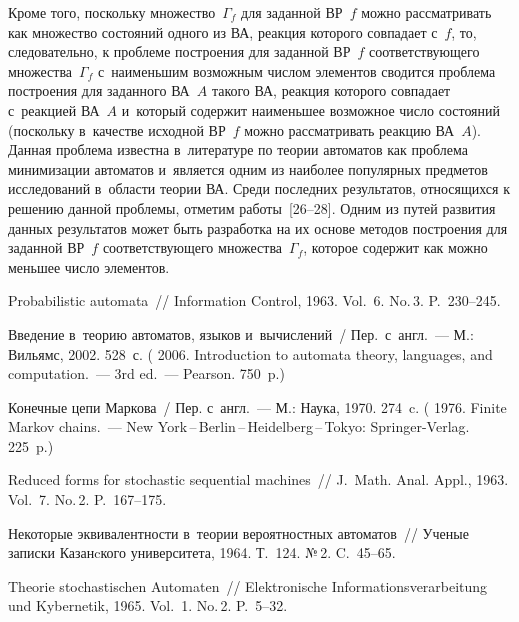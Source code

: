 \begin{multicols}{2}
Кроме того, поскольку множество~$\Gamma_f$ для заданной ВР~$f$
можно рассматривать как множество состояний одного из ВА, реакция которого совпадает с~$f$, то, следовательно,
к проблеме построения  для заданной ВР~$f$ соответствующего
множества~$\Gamma_f$ с~наименьшим
возможным чис\-лом
элементов сводится проблема построения
для заданного ВА~$A$
такого ВА, реакция которого
совпадает с~реакцией ВА~$A$ и~который содержит
наименьшее возможное чис\-ло состояний (поскольку в~качестве
исходной ВР~$f$ можно рассматривать реакцию ВА~$A$).
Данная проблема известна в~литературе по теории автоматов
как проблема минимизации автоматов и~является одним из
наиболее популярных предметов исследований в~области
теории ВА. Среди последних
результатов, относящихся
к решению данной проблемы, отметим работы~[26--28]. Одним из путей развития данных результатов
может быть  разработка на их основе  методов
построения для заданной ВР~$f$ соответствующего множества~$\Gamma_f$,
которое содержит как можно меньшее чис\-ло элементов.

{\small\frenchspacing
 {%
 \begin{thebibliography}{99}
Probabilistic automata~// Information Control, 1963.
Vol.~6. No.\,3. P.~230--245.

Введение в~тео\-рию автоматов, языков и~вы\-чис\-ле\-ний~/
Пер.\ с~англ.~--- М.: Вильямс, 2002.
528~с.
(
2006. {Introduction to automata theory, languages, and computation}.~---
3rd ed.~--- Pearson. 750~p.)

Конечные цепи Маркова~/ Пер. с~англ.~--- М.: Наука, 1970. 274~c.
(
1976. {Finite Markov chains.}~---
New York\,--\,Berlin\,--\,Heidelberg\,--\,Tokyo: Springer-Verlag.
225~p.)

Reduced forms for stochastic sequential machines~//
J.~Math. Anal. Appl., 1963.  Vol.~7. No.\,2. P.~167--175.

Некоторые эквивалентности в~теории вероятностных автоматов~//
Ученые записки Казанcкого университета, 1964. Т.~124. №\,2.
C.~45--65.

Theorie stochastischen Automaten~//
Elektronische Informationsverarbeitung und Kybernetik, 1965.
 Vol.~1. No.\,2. P.~5--32.


\end{thebibliography}}}
\end{multicols}
